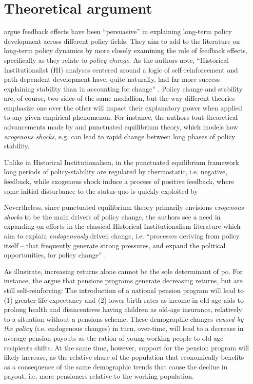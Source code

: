 \documentclass[11pt, xcolor=dvipsnames]{article}
\begin{document}
\section*{Theoretical argument}
\textcite[][]{Jacobs2014} argue feedback effects have been \enquote{persuasive}  in explaining long-term policy development across different policy fields. They aim to add to the literature on long-term policy dynamics by more closely examining the role of feedback effects, specifically as they relate to \textit{policy change}. As the authors note, \enquote{Historical Institutionalist (HI) analyses centered around a logic of self-reinforcement and path-dependent development have, quite naturally, had far more success explaining stability than in accounting for change} \parencite[][p. 443]{Jacobs2014}. Policy change and stability are, of course, two sides of the same medallion, but the way different theories emphasize one over the other will impact their explanatory power when applied to any given empirical phenomenon. For instance, the authors tout theoretical advancements made by \textcite[][]{Baumgartner2002} and punctuated equilibrium theory, which models how \textit{exogenous shocks}, e.g. can lead to rapid change between long phases of policy stability. 

Unlike in Historical Institutionalism, in the punctuated equilibrium framework long periods of policy-stability are regulated by thermostatic, i.e. negative, feedback, while exogenous shock induce a process of positive feedback, where some initial disturbance to the status-quo is quickly exploited by 

Nevertheless, since punctuated equilibrium theory primarily envisions \textit{exogenous shocks} to be the main drivers of policy change, the authors see a need in expanding on efforts in the classical Historical Institutionalism literature which aim to explain \textit{endogenously} driven change, i.e. \enquote{processes deriving from policy itself -- that frequently generate strong pressures, and expand the political opportunities, for policy change} \parencite[p. 442]{Jacobs2014}. 

As \textcite{Greif2004} illustrate, increasing returns alone cannot be the sole determinant of po. For instance, the \textcite{Greif2004} argue that pensions programs generate decreasing returns, but are still self-reinforcing: The introduction of a national pension program will lead to (1) greater life-expectancy and (2) lower birth-rates as income in old age aids to prolong health and disincentives having children as old-age insurance, relatively to a situation without a pensions scheme. These demographic changes \textit{caused by the policy} (i.e. endogenous changes) in turn, over-time, will lead to a decrease in average pension payouts as the ration of young working people to old age recipients shifts. At the same time, however, support for the pension program will likely increase, as the relative share of the population that economically benefits as a consequence of the same demographic trends that cause the decline in payout, i.e. more pensioners relative to the working population. 
\end{document}

